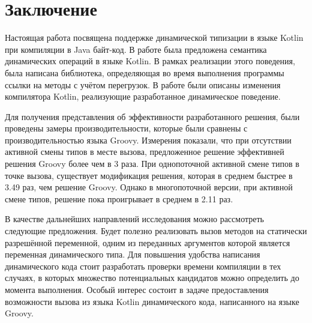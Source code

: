 \vfill
\clearpage
\section*{Заключение}


Настоящая работа посвящена поддержке динамической типизации в языке Kotlin при компиляции в Java байт-код.
В работе была предложена семантика динамических операций в языке Kotlin. В рамках реализации этого поведения, была написана библиотека, определяющая во время выполнения программы ссылки на методы с учётом перегрузок. В работе были описаны изменения компилятора Kotlin, реализующие разработанное динамическое поведение. 

Для получения представления об эффективности разработанного решения, были проведены замеры производительности, которые были сравнены с производительностью языка Groovy.
Измерения показали, что при отсутствии активной смены типов в месте вызова, предложенное решение эффективней решения Groovy более чем в 3 раза. При однопоточной активной смене типов в точке вызова, существует модификация решения, которая в среднем быстрее в 3.49 раз, чем решение Groovy. Однако в многопоточной версии, при активной смене типов, решение пока проигрывает в среднем в 2.11 раз.


В качестве дальнейших направлений исследования можно рассмотреть следующие предложения. Будет полезно реализовать вызов методов на статически разрешённой переменной, одним из переданных аргументов которой является переменная динамического типа. Для повышения удобства написания динамического кода стоит разработать проверки времени компиляции в тех случаях, в которых множество потенциальных кандидатов можно определить до момента выполнения. Особый интерес состоит в задаче предоставления возможности вызова из языка Kotlin динамического кода, написанного на языке Groovy.

